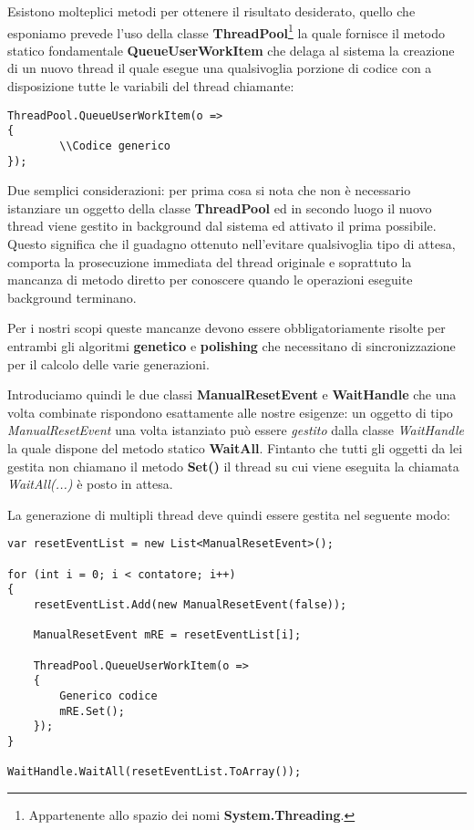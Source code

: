 \documentclass[11pt]{article}
\begin{document}
Esistono molteplici metodi per ottenere il risultato desiderato, quello che esponiamo prevede l'uso della classe \textbf{ThreadPool}\footnote{Appartenente allo spazio dei nomi \textbf{System.Threading}.} la quale fornisce il metodo statico fondamentale \textbf{QueueUserWorkItem} che delaga al sistema la creazione di un nuovo thread il quale esegue una qualsivoglia porzione di codice con a disposizione tutte le variabili del thread chiamante:

\begin{lstlisting}
ThreadPool.QueueUserWorkItem(o =>
{
        \\Codice generico
});
\end{lstlisting}

Due semplici considerazioni: per prima cosa si nota che non è necessario istanziare un oggetto della classe \textbf{ThreadPool} ed in secondo luogo il nuovo thread viene gestito in background dal sistema ed attivato il prima possibile. Questo significa che il guadagno ottenuto nell'evitare qualsivoglia tipo di attesa, comporta la prosecuzione immediata del thread originale e soprattuto la mancanza di metodo diretto per conoscere quando le operazioni eseguite background terminano.

Per i nostri scopi queste mancanze devono essere obbligatoriamente risolte per entrambi gli algoritmi \textbf{genetico} e \textbf{polishing} che necessitano di sincronizzazione per il calcolo delle varie generazioni.

Introduciamo quindi le due classi \textbf{ManualResetEvent} e \textbf{WaitHandle} che una volta combinate rispondono esattamente alle nostre esigenze: un oggetto di tipo \textit{ManualResetEvent} una volta istanziato può essere \textit{gestito} dalla classe \textit{WaitHandle} la quale dispone del metodo statico \textbf{WaitAll}. Fintanto che tutti gli oggetti da lei gestita non chiamano il metodo \textbf{Set()} il thread su cui viene eseguita la chiamata \textit{WaitAll(...)} è posto in attesa.

La generazione di multipli thread deve quindi essere gestita nel seguente modo:

\begin{lstlisting}
var resetEventList = new List<ManualResetEvent>();

for (int i = 0; i < contatore; i++)
{
    resetEventList.Add(new ManualResetEvent(false));
    
    ManualResetEvent mRE = resetEventList[i];
    
    ThreadPool.QueueUserWorkItem(o =>
    {
        Generico codice
        mRE.Set();
    });
}

WaitHandle.WaitAll(resetEventList.ToArray());
\end{lstlisting}
\end{document}
